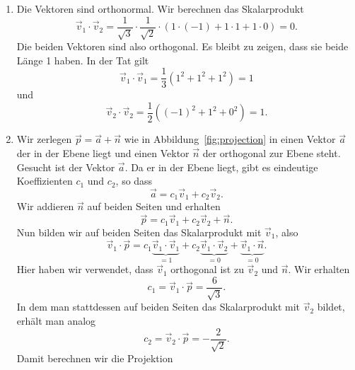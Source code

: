 \begin{losung}
	\phantom{text}
	\begin{enumerate}[label=(\alph*)]
		\item Die Vektoren sind orthonormal. Wir berechnen das Skalarprodukt
		\begin{equation*}
			\vec v_1\cdot\vec v_2= \frac{1}{\sqrt{3}}\cdot\frac{1}{\sqrt{2}}\cdot\left(1\cdot\left(-1\right)+1\cdot 1+1\cdot 0\right)=0.
		\end{equation*}
		Die beiden Vektoren sind also orthogonal.
		Es bleibt zu zeigen, dass sie beide Länge 1 haben. In der Tat gilt
		\begin{equation*}
			\vec v_1\cdot\vec v_1=\frac{1}{3}\left(1^2+1^2+1^2\right)=1
		\end{equation*}
		und
		\begin{equation*}
			\vec v_2\cdot\vec v_2=\frac{1}{2}\left(\left(-1\right)^2+1^2+0^2\right)=1.
		\end{equation*}
		\item Wir zerlegen $\vec p=\vec a+\vec n$ wie in Abbildung~\ref{fig:projection} in einen Vektor $\vec a$ der in der Ebene liegt und einen Vektor $\vec n$ der orthogonal zur Ebene steht.
		Gesucht ist der Vektor $\vec a$.
		Da er in der Ebene liegt, gibt es eindeutige Koeffizienten $c_1$ und $c_2$, so dass
		\begin{equation*}
			\vec a=c_1\vec v_1+c_2\vec v_2.
		\end{equation*}
		Wir addieren $\vec n$ auf beiden Seiten und erhalten
		\begin{equation*}
			\vec p=c_1\vec v_1+c_2\vec v_2+\vec n.
		\end{equation*}
		Nun bilden wir auf beiden Seiten das Skalarprodukt mit $\vec v_1$, also
		\begin{equation*}
			\vec v_1\cdot\vec p=c_1\underbrace{\vec v_1\cdot\vec v_1}_{=1}+c_2\underbrace{\vec v_1\cdot\vec v_2}_{=0}+\underbrace{\vec v_1\cdot\vec n}_{=0}.
		\end{equation*}
		Hier haben wir verwendet, dass $\vec v_1$ orthogonal ist zu $\vec v_2$ und $\vec n$.
		Wir erhalten
		\begin{equation*}
			c_1=\vec v_1\cdot\vec p=\frac{6}{\sqrt{3}}.
		\end{equation*}
		In dem man stattdessen auf beiden Seiten das Skalarprodukt mit $\vec v_2$ bildet, erhält man analog
		\begin{equation*}
			c_2=\vec v_2\cdot\vec p=-\frac{2}{\sqrt{2}}.
		\end{equation*}
		Damit berechnen wir die Projektion

\end{enumerate}
\end{losung}
